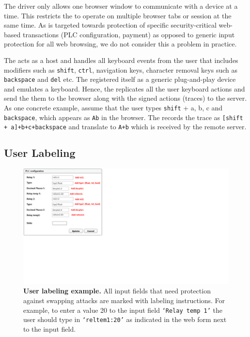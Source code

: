  The \webusb driver only allows one browser window to communicate with a \usb device at a time. This restricts the \device to operate on multiple browser tabs or session at the same time. As \name is targeted towards protection of specific security-critical web-based transactions (PLC configuration, payment) as opposed to generic input protection for all web browsing, we do not consider this a problem in practice.

The \device acts as a \usb host and handles all keyboard events from the user that includes modifiers such as \texttt{shift}, \texttt{ctrl}, navigation keys, character removal keys such as \texttt{backspace} and \texttt{del} etc. The \device registered itself as a generic \usb plug-and-play device and emulates a keyboard. Hence, the \device replicates all the user keyboard actions and send the them to the browser along with the signed actions (traces) to the server. 
%
As one concrete example, assume that the user types \texttt{shift} + a, b, c and \texttt{backspace}, which appears as \texttt{Ab} in the browser. The \device records the trace as \texttt{[shift + a]+b+c+backspace} and translate to \texttt{A+b} which is received by the remote server. 
\subsection{User Labeling}
\label{sec:integriKey:labeling}

\begin{figure}[t]
 \centering
 \includegraphics[trim={0 7cm 20cm 0},clip,width=0.65\linewidth]{chapters/IntegriKey/images/labelExample_revised.pdf}
 \caption{\textbf{User labeling example.} All input fields that need protection against swapping attacks are marked with labeling instructions. For example, to enter a value 20 to the input field \texttt{`Relay temp 1'} the user should type in \texttt{`reltem1:20'} as indicated in the web form next to the input field.} 
 \vspace{-10pt}
 \label{fig:labelEx}
\end{figure}

